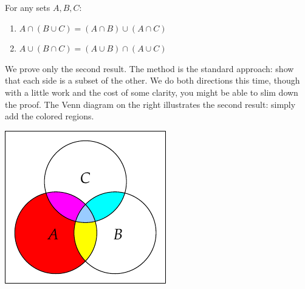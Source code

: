 \noindent\begin{minipage}{0.65\textwidth}
\begin{thmm}\label{thm:setdist}
For any sets $A,B,C$:
\begin{enumerate}\setlength{\itemsep}{2pt}
\item $A\cap(B\cup C)=(A\cap B)\cup(A\cap C)$
\item $A\cup(B\cap C)=(A\cup B)\cap(A\cup C)$
\end{enumerate}
\end{thmm}

We prove only the second result. The method is the standard approach: show that each side is a subset of the other. We do both directions this time, though with a little work and the cost of some clarity, you might be able to slim down the proof. The Venn diagram on the right illustrates the second result: simply add the colored regions.
\end{minipage}\qquad
\begin{minipage}{0.28\textwidth}\centering
\includegraphics[width=\textwidth]{sets-07-venndist}
\end{minipage}\\


